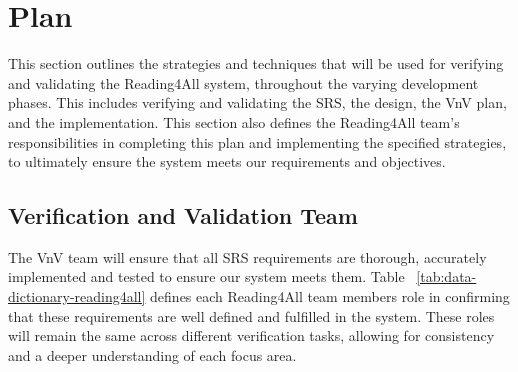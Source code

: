 \documentclass[12pt, titlepage]{article}
\begin{document}
\section{Plan}

This section outlines the strategies and techniques that will be used for verifying and validating the Reading4All system, throughout the varying development phases. 
This includes verifying and validating the SRS, the design, the VnV plan, and the implementation. This section also defines the Reading4All team's responsibilities in 
completing this plan and implementing the specified strategies, to ultimately ensure the system meets our requirements and objectives.

\subsection{Verification and Validation Team}

The VnV team will ensure that all SRS requirements are thorough, accurately implemented and tested to ensure our system meets them. 
Table ~\ref{tab:data-dictionary-reading4all} defines each Reading4All team members role in confirming that these requirements are well defined and fulfilled in the system.
These roles will remain the same across different verification tasks, allowing for consistency and a deeper understanding of each focus area. 
\end{document}
